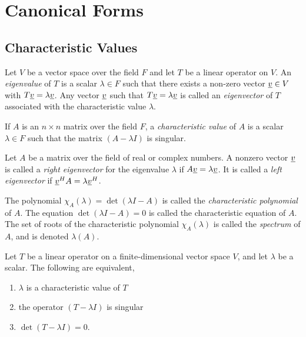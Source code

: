 \chapter{Canonical Forms}

\section{Characteristic Values}

\begin{definition}
Let $V$ be a vector space over the field $F$ and let $T$ be a linear operator on $V$.
An \emph{eigenvalue} of $T$ is a scalar $\lambda \in F$ such that there exists a non-zero vector $\underline{v} \in V$ with $T \underline{v} = \lambda \underline{v}$.
Any vector $\underline{v}$ such that $T \underline{v} = \lambda \underline{v}$ is called an \emph{eigenvector} of $T$ associated with the characteristic value $\lambda$.
\end{definition}

\begin{definition}
If $A$ is an $n \times n$ matrix over the field $F$, a \emph{characteristic value} of $A$ is a scalar $\lambda \in F$ such that the matrix $(A - \lambda I)$ is singular.
\end{definition}

Let $A$ be a matrix over the field of real or complex numbers.
A nonzero vector $\underline{v}$ is called a \emph{right eigenvector} for the eigenvalue $\lambda$ if $A \underline{v} = \lambda \underline{v}$.
It is called a \emph{left eigenvector} if $\underline{v}^H A = \lambda \underline{v}^H$.

The polynomial $\chi_A (\lambda) = \det (\lambda I - A)$ is called the \emph{characteristic polynomial} of $A$.
The equation $\det (\lambda I - A) = 0$ is called the characteristic equation of $A$.
The set of roots of the characteristic polynomial $\chi_A (\lambda)$ is called the \emph{spectrum} of $A$, and is denoted $\lambda(A)$.

\begin{fact}
Let $T$ be a linear operator on a finite-dimensional vector space $V$, and let $\lambda$ be a scalar.
The following are equivalent,
\begin{enumerate}
\item $\lambda$ is a characteristic value of $T$
\item the operator $(T - \lambda I)$ is singular
\item $\det (T - \lambda I) = 0$.
\end{enumerate}
\end{fact}

